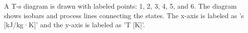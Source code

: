 A T-s diagram is drawn with labeled points: 1, 2, 3, 4, 5, and 6. The diagram shows isobars and process lines connecting the states. The x-axis is labeled as 's [kJ/kg·K]' and the y-axis is labeled as 'T [K]'.
